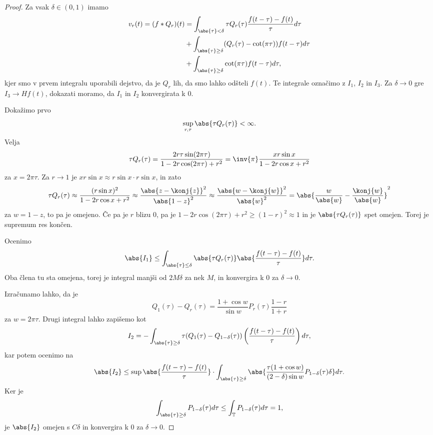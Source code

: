 \begin{proof}
  Za vsak $\delta \in (0,1)$ imamo
  \begin{align*}
	v_r(t) = (f * Q_r)(t)
	&= \int_{\abs{\tau} < \delta} \tau Q_r(\tau) \frac{f(t - \tau) - f(t)}{\tau}
	d\tau \\
	&+ \int_{\abs{\tau} \ge \delta} (Q_r(\tau) - \cot(\pi \tau)) f(t - \tau)
	d\tau \\
	&+ \int_{\abs{\tau} \ge \delta} \cot(\pi \tau) f(t - \tau) d\tau,
  \end{align*}
  kjer smo v prvem integralu uporabili dejstvo, da je $Q_r$ lih, da smo lahko
  odšteli $f(t)$.
  Te integrale označimo z $I_1$, $I_2$ in $I_3$.
  Za $\delta \to 0$ gre $I_3 \to Hf(t)$, dokazati moramo, da $I_1$ in $I_2$
  konvergirata k $0$.

  Dokažimo prvo
  \[
	\sup_{r, \tau} \abs{\tau Q_r(\tau)} < \infty.
  \]
  Velja
  \[
	\tau Q_r(\tau) = \frac{2 r \tau \sin(2 \pi \tau)}{1 - 2r \cos(2 \pi \tau) +
	  r^2}
	= \inv{\pi} \frac{xr \sin x}{1 - 2 r \cos x + r^2}
  \]
  za $x = 2 \pi \tau$.
  Za $r \to 1$ je $x r \sin x \approx r \sin x \cdot r \sin x$, in zato
  \[
	\tau Q_r(\tau) \approx \frac{(r \sin x)^2}{1 - 2r \cos x + r^2}
	\approx \frac{\abs{z - \konj{z}}^2}{\abs{1 - z}^2}
	\approx \frac{\abs{w - \konj{w}}^2}{\abs{w}^2}
	= \abs{\frac{w}{\abs{w}} - \frac{\konj{w}}{\abs{w}}}^2
  \]
  za $w = 1-z$, to pa je omejeno.
  Če pa je $r$ blizu $0$, pa je $1 - 2r \cos (2 \pi \tau) + r^2 \ge (1-r)^2
  \approx 1$ in je $\abs{\tau Q_r(\tau)}$ spet omejen.
  Torej je supremum res končen.

  Ocenimo
  \[
	\abs{I_1} \le \int_{\abs{\tau} \le \delta} \abs{\tau Q_r(\tau)}
	\abs{\frac{f(t-\tau) - f(t)}{\tau}} d\tau.
  \]
  Oba člena tu sta omejena, torej je integral manjši od $2 M \delta$ za nek $M$,
  in konvergira k $0$ za $\delta \to 0$.

  Izračunamo lahko, da je
  \[
	Q_1(\tau) - Q_r(\tau) = \frac{1 + \cos w}{\sin w} P_r(\tau) \frac{1-r}{1+r}
  \]
  za $w = 2 \pi \tau$.
  Drugi integral lahko zapišemo kot
  \[
	I_2 = - \int_{\abs{\tau} \ge \delta} \tau (Q_1(\tau) - Q_{1 - \delta}(\tau))
	\left( \frac{f(t-\tau) - f(t)}{\tau} \right) d\tau,
  \]
  kar potem ocenimo na
  \[
	\abs{I_2} \le \sup \abs{\frac{f(t-\tau) - f(t)}{\tau}} \cdot
	\int_{\abs{\tau} \ge \delta} \abs{\frac{\tau (1 + \cos w)}{(2 - \delta) \sin
		w} P_{1-\delta}(\tau) \delta} d\tau.
  \]
  Ker je
  \[
	\int_{\abs{\tau} \ge \delta} P_{1-\delta}(\tau) d\tau
	\le \int_{\mathbb{T}} P_{1-\delta}(\tau) d\tau = 1,
  \]
  je $\abs{I_2}$ omejen s $C \delta$ in konvergira k $0$ za $\delta \to 0$.
\end{proof}

